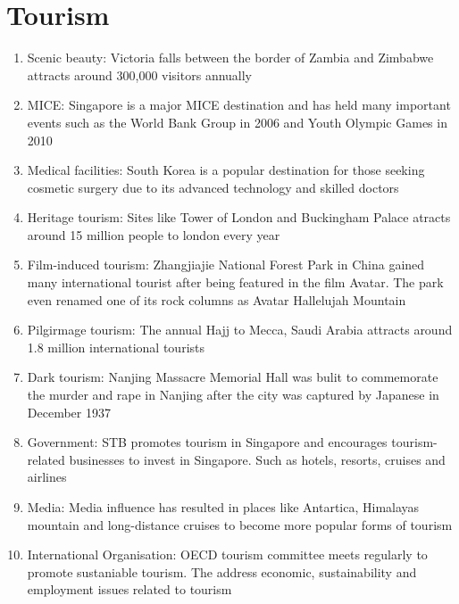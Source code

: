 \documentclass[oneside]{book}
\begin{document}
\chapter{Tourism}
\begin{minipage}{0.5\textwidth}
  \begin{enumerate}
    \item Scenic beauty: Victoria falls between the border of Zambia and Zimbabwe attracts around 300,000 visitors annually

    \item MICE: Singapore is a major MICE destination and has held many important events such as the World Bank Group in 2006 and Youth Olympic Games in 2010
    
    \item Medical facilities: South Korea is a popular destination for those seeking cosmetic surgery due to its advanced technology and skilled doctors
    
    \item Heritage tourism: Sites like Tower of London and Buckingham Palace atracts around 15 million people to london every year
    
    \item Film-induced tourism: Zhangjiajie National Forest Park in China gained many international tourist after being featured in the film Avatar. The park even renamed one of its rock columns as Avatar Hallelujah Mountain
    
    \item Pilgirmage tourism: The annual Hajj to Mecca, Saudi Arabia attracts around 1.8 million international tourists
    
    \item Dark tourism: Nanjing Massacre Memorial Hall was bulit to commemorate the murder and rape in Nanjing after the city was captured by Japanese in December 1937
    
    \item Government: STB promotes tourism in Singapore and encourages tourism-related businesses to invest in Singapore. Such as hotels, resorts, cruises and airlines
    
    \item Media: Media influence has resulted in places like Antartica, Himalayas mountain and long-distance cruises to become more popular forms of tourism
    
    \item International Organisation: OECD tourism committee meets regularly to promote sustaniable tourism. The address economic, sustainability and employment issues related to tourism
  \end{enumerate}
  \vspace{0.1cm}
\end{minipage}
\end{document}

